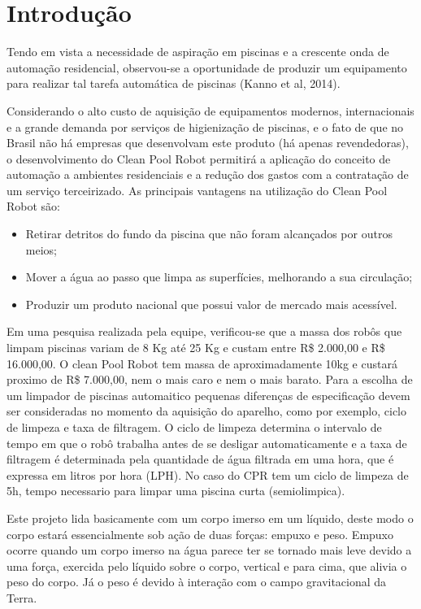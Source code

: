 \chapter{Introdução}
Tendo em vista a necessidade de aspiração em piscinas e a crescente onda de automação residencial, observou-se a oportunidade de produzir um equipamento para realizar tal tarefa automática de piscinas (Kanno et al, 2014).

Considerando o alto custo de aquisição de equipamentos modernos, internacionais e a grande demanda por serviços de higienização de piscinas, e o fato de que no Brasil não há empresas que desenvolvam este produto (há apenas revendedoras), o desenvolvimento do Clean Pool Robot permitirá a aplicação do conceito de automação a ambientes residenciais e a redução dos gastos com a contratação de um serviço terceirizado. As principais vantagens na utilização do Clean Pool Robot são:

\begin{itemize}
\item Retirar detritos do fundo da piscina que não foram alcançados por outros meios;
\item Mover a água ao passo que limpa as superfícies, melhorando a sua circulação;
\item Produzir um produto nacional que possui valor de mercado mais acessível.
\end{itemize}

Em uma pesquisa realizada pela equipe, verificou-se que a massa dos robôs que limpam piscinas variam de 8 Kg até 25 Kg e custam entre R\$ 2.000,00 e R\$ 16.000,00. O clean Pool Robot tem massa de aproximadamente 10kg e custará proximo de R\$ 7.000,00, nem o mais caro e nem o mais barato. Para a escolha de um limpador de piscinas automaitico pequenas diferenças de especificação devem ser consideradas no momento da aquisição do aparelho, como por exemplo, ciclo de limpeza e taxa de filtragem. O ciclo de limpeza determina o intervalo de tempo em que o robô trabalha antes de se desligar automaticamente e a taxa de filtragem é determinada pela quantidade de água filtrada em uma hora, que é expressa em litros por hora (LPH). No caso do CPR tem um ciclo de limpeza de 5h, tempo necessario para limpar uma piscina curta (semiolimpica).

Este projeto lida basicamente com um corpo imerso em um líquido, deste modo o corpo estará essencialmente sob ação de duas forças: empuxo e peso.  Empuxo ocorre quando um corpo imerso na água parece ter se tornado mais leve devido a uma força, exercida pelo líquido sobre o corpo, vertical e para cima, que alivia o peso do corpo. Já o peso é devido à interação com o campo gravitacional da Terra.

